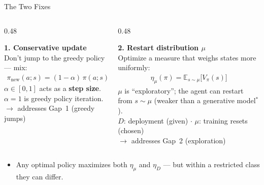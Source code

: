 \documentclass[aspectratio=169]{beamer}
\newcommand{\E}{\mathbb{E}}
\newcommand{\pinew}{\pi_{\mathrm{new}}}
\begin{document}
\begin{frame}{The Two Fixes}
  \begin{columns}[t]
    \begin{column}{0.48\textwidth}
      \begin{warmbox}[equal height group=twofixes]
        \textbf{\color{AtlasWarm}1. Conservative update}\\[4pt]
        \small Don't jump to the greedy policy --- mix:
        \begin{gather*}
          \pinew(a;s) = (1-\alpha)\,\pi(a;s) + \alpha\,\pi'(a;s)
        \end{gather*}
        $\alpha \in [0,1]$ acts as a \textbf{step size}. $\alpha = 1$ is greedy policy iteration.\\[2pt]
        {\scriptsize\color{AtlasWarm} $\to$ addresses Gap~1 (greedy jumps)}
      \end{warmbox}
    \end{column}
    \begin{column}{0.48\textwidth}
      \begin{coolbox}[equal height group=twofixes]
        \textbf{\color{AtlasCool}2. Restart distribution $\mu$}\\[4pt]
        \small Optimize a measure that weighs states more uniformly:
        \begin{gather*}
          \eta_\mu(\pi) = \E_{s\sim\mu}\big[V_\pi(s)\big]
        \end{gather*}
        {\footnotesize $\mu$ is ``exploratory''; the agent can restart from $s\sim\mu$ (weaker than a generative model$^{*}$).\\[2pt]
        $D$: deployment (given) $\cdot$ $\mu$: training resets (chosen)}\\[2pt]
        {\scriptsize\color{AtlasCool} $\to$ addresses Gap~2 (exploration)}
      \end{coolbox}
    \end{column}
  \end{columns}

  \vspace{2pt}
  \begin{itemize}
    \item Any optimal policy maximizes both $\eta_\mu$ and $\eta_D$ --- but within a restricted class they can differ.
  \end{itemize}


\end{frame}
\end{document}
